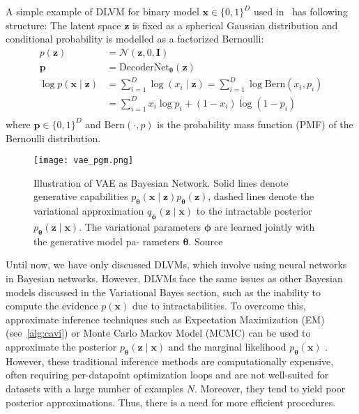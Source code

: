 \begin{example}
    A simple example of DLVM for binary model $\mathbf{x} \in \{0,1\}^{D}$ used in~\cite{vae-ssl-dgm-2014} has following structure:
    The latent space $\mathbf{z}$ is fixed as a spherical Gaussian distribution and conditional probability is modelled as
    a factorized Bernoulli:
    \begin{align*}
        p(\mathbf{z}) &= \mathcal{N}(\mathbf{z},0,\mathbf{I})\\
        \mathbf{p} &= \mathrm{DecoderNet}_{\boldsymbol{\theta}}(\mathbf{z}) \\
        \log p(\mathbf{x}\mid \mathbf{z}) &= \sum_{i=1}^D \log(x_i \mid  \mathbf{z}) = \sum_{i=1}^D \log \mathrm{Bern}(x_i,p_i)\\
        &= \sum_{i=1}^D x_i \log p_i + (1-x_i) \log(1-p_i)\\
    \end{align*}
    where $\mathbf{p} \in \{0,1\}^{D}$ and $\mathrm{Bern}(\cdot,p)$ is the probability mass function (PMF)
    of the Bernoulli distribution.
\end{example}

\begin{figure}[tb]
    \centering
    \texttt{[image: vae\_pgm.png]}
    \caption[VAE as Bayesian network]{Illustration of VAE as Bayesian Network. Solid lines denote generative capabilities 
    $p_{\boldsymbol{\theta}}(\mathbf{x}\mid \mathbf{z})p_{\boldsymbol{\theta}}(\mathbf{z})$, dashed lines denote the variational approximation $q_{\boldsymbol{\phi}}(\mathbf{z}\mid \mathbf{x})$
    to the intractable posterior $p_{\boldsymbol{\theta}}(\mathbf{z}\mid \mathbf{x})$. The variational parameters ${\boldsymbol{\phi}}$ are learned jointly with the generative model pa-
    rameters ${\boldsymbol{\theta}}$. Source \cite{vae-original-2013}}
    \label{fig:vae_pgm}
\end{figure}

Until now, we have only discussed DLVMs, which involve using neural networks in Bayesian networks. However, DLVMs face the same issues as 
other Bayesian models discussed in the Variational Bayes section, such as the inability to compute the evidence $p(\mathbf{x})$ due to 
intractabilities. To overcome this, approximate inference techniques such as Expectation Maximization (EM) (see~\ref{alg:cavi}) or 
Monte Carlo Markov Model (MCMC)  can be used to approximate the posterior $p_{\boldsymbol{\theta}}(\mathbf{z}\mid \mathbf{x})$ and the marginal 
likelihood $p_{\boldsymbol{\theta}}(\mathbf{x})$ \cite[appx.~A2]{intro-vae-2019}.  However, these traditional inference methods are computationally expensive,
often requiring per-datapoint optimization loops and are not well-suited for datasets with a large number of examples $N$. Moreover, they tend
to yield poor posterior approximations. Thus, there is a need for more efficient procedures.

